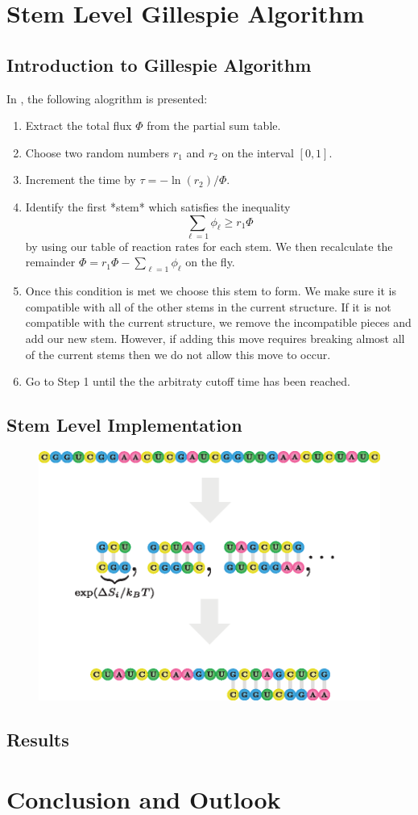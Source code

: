 \documentclass[11pt]{article}
\begin{document}
\lipsum[2]
\section{Stem Level Gillespie Algorithm}
\subsection{Introduction to Gillespie Algorithm}
In \cite{10.1093/nar/gkv480}, the following alogrithm is presented:
\begin{enumerate}
\item Extract the total flux $\Phi$ from the partial sum table.
\item Choose two random numbers $r_{1}$ and $r_{2}$ on the interval $[0, 1]$.
\item  Increment the time by $\tau = - \ln(r_{2})/\Phi$.
\item Identify the first *stem* which satisfies the inequality $$ \sum_{\ell =1} \phi_{\ell} \geq r_{1} \Phi$$ by using our table of reaction rates for each stem. We then recalculate the remainder $\Phi = r_{1} \Phi - \sum_{\ell = 1} \phi_{\ell}$ on the fly.
\item Once this condition is met we choose this stem to form. We make sure it is compatible with all of the other stems in the current structure. If it is not compatible with the current structure, we remove the incompatible pieces and add our new stem. However, if adding this move requires breaking almost all of the current stems then we do not allow this move to occur.
\item Go to Step 1 until the the arbitraty cutoff time has been reached.
\end{enumerate}

\subsection{Stem Level Implementation}

\begin{figure}[H]
\centering
\includegraphics{fig/rna_gillespie_algo}
\end{figure}
\lipsum[2]
\subsection{Results}
\lipsum[2]
\section{Conclusion and Outlook}
\lipsum[2-4]
\lipsum[2-4]
\newpage
\nocite{*}
\printbibliography
\end{document}

